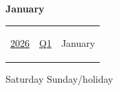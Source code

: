 \noindent
\begin{minipage}[t]{\dimexpr\linewidth-4.2cm-4mm}
  \vspace{0pt}
  {\fontsize{15}{15}\selectfont\textbf{January}}
  
  \vspace{1mm}
  \myLineThick
\end{minipage}%
\hfill%
\begin{minipage}[t]{4.2cm}
  \vspace{0pt}\raggedleft
  {\fontsize{7}{8}\selectfont \begin{tabular}{|l|l|l}
\hyperlink{2026}{2026} & \hyperlink{Q1}{Q1} & \hypertarget{January}{January}
\end{tabular} }
  \vspace{1mm}

  {\fontsize{5.5}{6}\selectfont
  \textcolor{gray!60!black}{Saturday}\hspace{1mm}
  \textcolor{red!70!black}{Sunday/holiday}}
\end{minipage}

\vspace{1mm}

